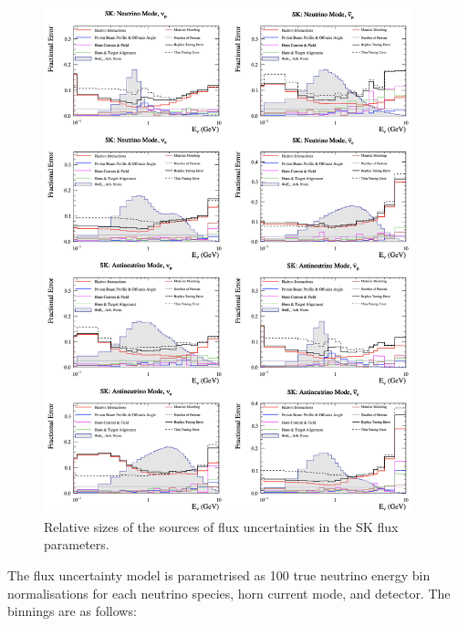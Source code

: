 \begin{center}
\begin{figure}[!htbp]
\begin{adjustwidth}{-.9in}{-.9in}
\centering
\includegraphics*[width=0.95\textwidth,clip]{figs/fluxsourceSK}
\caption{Relative sizes of the sources of flux uncertainties in the SK flux parameters.}\label{fig:fluxsourceSK}
\end{adjustwidth}
\end{figure}
\end{center}

The flux uncertainty model is parametrised as 100 true neutrino energy bin normalisations for each neutrino species, horn current mode, and detector. The binnings are as follows:

